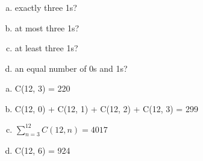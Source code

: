 \begin{enumerate}[a.]
    \item exactly three 1s?
    \item at most three 1s?
    \item at least three 1s?
    \item an equal number of 0s and 1s?
\end{enumerate}
\answer
\begin{enumerate}[a.]
    \item C(12, 3) = 220
    \item C(12, 0) + C(12, 1) + C(12, 2) + C(12, 3) = 299
    \item $\sum_{n=3}^{12} C(12, n) = 4017$
    \item C(12, 6) = 924
\end{enumerate}


